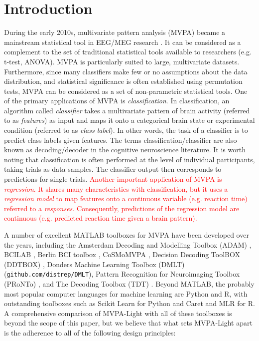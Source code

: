 \documentclass[utf8]{frontiersSCNS} %
\newcommand{\red}[1]{\textcolor{red}{#1}}
\begin{document}
\section{Introduction}

During the early 2010s, multivariate pattern analysis (MVPA) became a mainstream statistical tool in EEG/MEG research \citep{Blankertz2011,Lemm2011,Mur2009,Grootswagers2017DecodingData,Pereira2009,Varoquaux2017}. It can be considered as a complement to the set of traditional statistical tools available to researchers (e.g. t-test, ANOVA). MVPA is particularly suited to large, multivariate datasets. Furthermore, since many classifiers make few or no assumptions about the data distribution, and statistical significance is often established using permutation tests, MVPA can be considered as a set of non-parametric statistical tools.
One of the primary applications of MVPA is \textit{classification}. In classification, an algorithm called \textit{classifier} takes a multivariate pattern of brain activity (referred to as \textit{features}) as input and maps it onto a categorical brain state or experimental condition (referred to as \textit{class label}). In other words, the task of a classifier is to predict class labels given features. The terms classification/classifier are also known as decoding/decoder in the cognitive neuroscience literature. It is worth noting that classification is often performed at the level of individual participants, taking trials as data samples. The classifier output then corresponds to predictions for single trials. \red{Another important application of MVPA is \textit{regression}. It shares many characteristics with classification, but it uses a \textit{regression model} to map features onto a continuous variable (e.g. reaction time) referred to a \textit{responses}. Consequently, predictions of the regression model are continuous  (e.g. predicted reaction time given a brain pattern).}

A number of excellent MATLAB toolboxes for MVPA have been developed over the years, including the Amsterdam Decoding and Modelling Toolbox (ADAM) \citep{Fahrenfort2018FromADAM}, BCILAB \citep{Kothe2013BCILAB:Development}, Berlin BCI toolbox \citep{Blankertz2016TheControl}, CoSMoMVPA \citep{Oosterhof2016CoSMoMVPA:Octave}, Decision Decoding ToolBOX (DDTBOX) \citep{Bode2019ThePotentials}, Donders Machine Learning Toolbox (DMLT) (\texttt{github.com/distrep/DMLT}), Pattern Recognition for Neuroimaging Toolbox (PRoNTo) \citep{Schrouff2013PRoNTo:Toolbox}, and The Decoding Toolbox (TDT) \citep{Hebart2015TheData}. Beyond MATLAB, the probably most popular computer languages for machine learning are Python and R, with outstanding toolboxes such as Scikit Learn \citep{Pedregosa2011Scikit-learn:Python} for Python and Caret \citep{Kuhn2008BuildingPackage} and MLR \citep{Bischl2000Mlr:R} for R. A comprehensive comparison of MVPA-Light with all of these toolboxes is beyond the scope of this paper, but we believe that what sets MVPA-Light apart is the adherence to all of the following design principles: 
\end{document}
